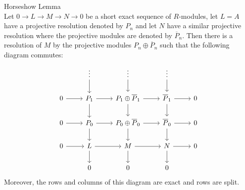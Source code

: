 \begin{lemma}{Horseshow Lemma}\\
Let $0 \to L \to M \to N \to 0$ be a short exact sequence of $R$-modules, let $L=A$ have a projective resolution denoted by $P_n$ and let $N$ have a similar projective resolution where the projective modules are denoted by $\overline{P}_n$. Then there is a resolution of $M$ by the projective modules $P_n \oplus \overline{P}_n$ such that the following diagram commutes:
\[
\begin{tikzcd}
    &\vdots \arrow[d] &\vdots \arrow[d] &\vdots \arrow[d]\\
    0 \arrow[r] &P_1 \arrow[r] \arrow[d]& P_1 \oplus \overline{P}_1 \arrow[r] \arrow[d] &\overline{P}_1 \arrow[r] \arrow[d]& 0\\
    0 \arrow[r] &P_0 \arrow[r] \arrow[d]& P_0 \oplus \overline{P}_0 \arrow[r] \arrow[d]& \overline{P}_0 \arrow[r] \arrow[d] & 0\\
    0 \arrow[r] &L \arrow[r] \arrow[d]&M \arrow[r] \arrow[d]&N \arrow[r] \arrow[d]& 0\\
    &0&0&0
\end{tikzcd}
\]
Moreover, the rows and columns of this diagram are exact and rows are split.
\end{lemma}


